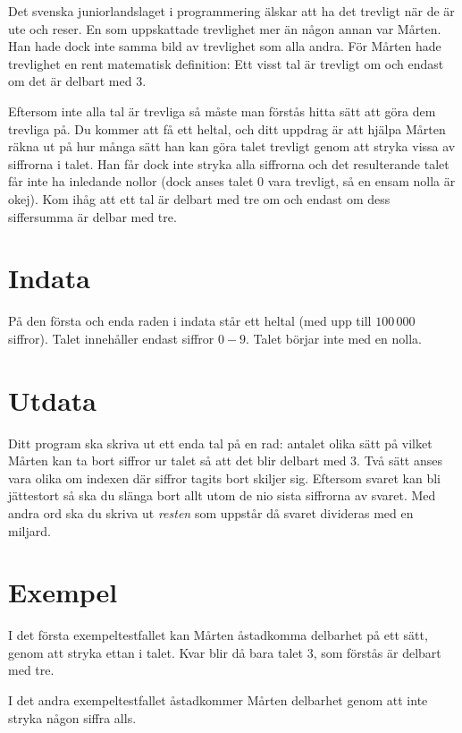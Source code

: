 Det svenska juniorlandslaget i programmering älskar att ha det trevligt när de
är ute och reser. En som uppskattade trevlighet mer än någon annan var Mårten.
Han hade dock inte samma bild av trevlighet som alla andra. För Mårten hade
trevlighet en rent matematisk definition: Ett visst tal är trevligt om och
endast om det är delbart med 3.

Eftersom inte alla tal är trevliga så måste man förstås hitta sätt att göra dem
trevliga på. Du kommer att få ett heltal, och ditt uppdrag är att hjälpa Mårten
räkna ut på hur många sätt han kan göra talet trevligt genom att stryka vissa av
siffrorna i talet. Han får dock inte stryka alla siffrorna och det resulterande
talet får inte ha inledande nollor (dock anses talet $0$ vara trevligt, så en
ensam nolla är okej). Kom ihåg att ett tal är delbart med tre om
och endast om dess siffersumma är delbar med tre.

\section*{Indata}
På den första och enda raden i indata står ett heltal (med upp till $100\,000$
siffror). Talet innehåller endast siffror $0-9$. Talet börjar inte med en nolla.

\section*{Utdata}
Ditt program ska skriva ut ett enda tal på en rad: antalet olika sätt på vilket
Mårten kan ta bort siffror ur talet så att det blir delbart med 3. Två sätt
anses vara olika om indexen där siffror tagits bort skiljer sig. Eftersom
svaret kan bli jättestort så ska du slänga bort allt utom de nio sista siffrorna av svaret. Med andra ord
ska du skriva ut \emph{resten} som uppstår då svaret divideras med en miljard. 


\section*{Exempel}
I det första exempeltestfallet kan Mårten åstadkomma delbarhet på ett sätt,
genom att stryka ettan i talet. Kvar blir då bara talet 3, som förstås är
delbart med tre.

I det andra exempeltestfallet åstadkommer Mårten delbarhet genom att inte
stryka någon siffra alls.

